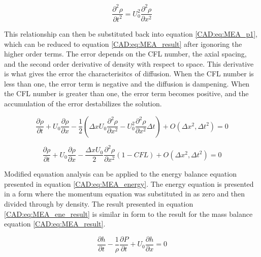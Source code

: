 \documentclass{mc2015}
\begin{document}
    \begin{equation}
    \label{CAD:eq:mass_second_derivatives}
    	 \frac{\partial^2 \rho}{\partial t^2} =  U_{0}^2 \frac{\partial^2 \rho}{\partial x^2}
    \end{equation} \linebreak
    
    This relationship can then be substituted back into equation \ref{CAD:eq:MEA_p1}, 
    which can be reduced to equation \ref{CAD:eq:MEA_result} after igonoring the higher
    order terms. The error depends on the CFL number, the axial spacing, and the
    second order derivative of density with respect to space. This derivative is
    what gives the error the characterisitcs of diffusion. When the CFL number is
    less than one, the error term is negative and the diffusion is dampening. When
    the CFL number is greater than one, the error term becomes positive, and the
    accumulation of the error destabilizes the solution. 
    
    \begin{equation}
    	 \frac{\partial \rho}{\partial t}  +  U_{0} \frac{\partial \rho}{\partial x} - 
    	  \frac{1}{2}  \left(  \Delta x U_{0} \frac{\partial^2 \rho}{\partial
    	  x^2} -   U_{0}^2 \frac{\partial^2 \rho}{\partial x^2} \Delta t  \right) 
    	   + O(\Delta x^{2},\Delta t^{2}) = 0
    \end{equation}
    
    \begin{equation}
    \label{CAD:eq:MEA_result}
    	 \frac{\partial \rho}{\partial t}  +  U_{0} \frac{\partial \rho}{\partial x} - 
    	 \frac{\Delta x U_{0}}{2} \frac{\partial^2 \rho}{\partial x^2}  
    	 \left(  1 - CFL  \right) 
    	 + O(\Delta x^{2},\Delta t^{2})  = 0
    \end{equation}
    
    Modified eqauation analysis can be applied to the energy balance equation
    presented in equation \ref{CAD:eq:MEA_energy}. The energy equation is presented in a form where
    the momentum equation was substituted in as zero and then divided through by
    density. The result presented in equation \ref{CAD:eq:MEA_ene_result} is similar in
    form to the result for the mass balance equation \ref{CAD:eq:MEA_result}.
    
    \begin{equation}
    	\label{CAD:eq:MEA_energy}
    	\frac{\partial h}{\partial t} - \frac{1}{\rho} \frac{\partial P}{\partial t} +
    	U_{0} \frac{\partial h}{\partial x} = 0
    \end{equation}
    
\end{document}
